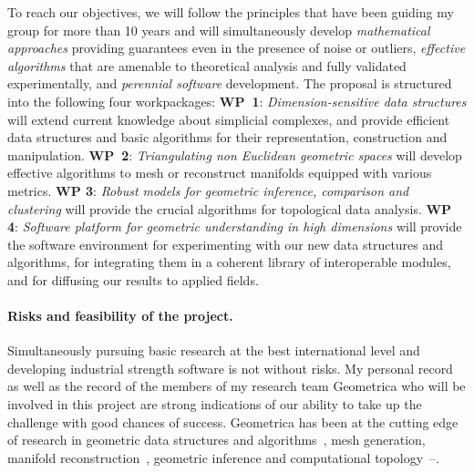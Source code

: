 To reach our objectives, we will follow the principles that have been guiding my group for more than 10 years and will simultaneously develop
{\em mathematical approaches} providing guarantees even in the presence of noise or outliers,
{\em effective algorithms} that are amenable to theoretical analysis and fully validated experimentally,
and {\em perennial software} development.
The proposal is structured into the following four workpackages:
{\bf WP~1}:  {\em Dimension-sensitive data  structures} will extend current knowledge about simplicial complexes, and  provide efficient data structures and basic algorithms for their representation, construction and manipulation. 
  {\bf WP~2}:  {\em Triangulating non Euclidean geometric spaces} will develop effective algorithms to mesh or reconstruct manifolds equipped with various metrics.   {\bf WP 3}: {\em Robust models for geometric inference, comparison and  clustering} will provide the crucial  algorithms for topological data analysis.
 {\bf WP 4}:  {\em  Software platform for geometric understanding in high dimensions} will provide the software environment for experimenting with our new data structures and algorithms, for integrating them in a coherent library of interoperable modules, and for diffusing our results to applied fields. 

\paragraph{Risks and feasibility of the project.} 
Simultaneously pursuing basic research at the best international level and developing industrial strength software is not without risks. %
My personal record as well as the record of the members of my research team  Geometrica who will be involved in this project are strong indications of our ability to take up the challenge with good chances of success.  Geometrica has been at the cutting edge of research in geometric data structures and algorithms~\cite{by-ag-98,geometrica-ecg-book}, mesh generation, manifold reconstruction~\cite{geometrica-7142i,geometrica-bgo-09}, geometric inference and computational topology~\cite{geometrica-ccl09}--\cite{geometrica-cseh-07}. %


